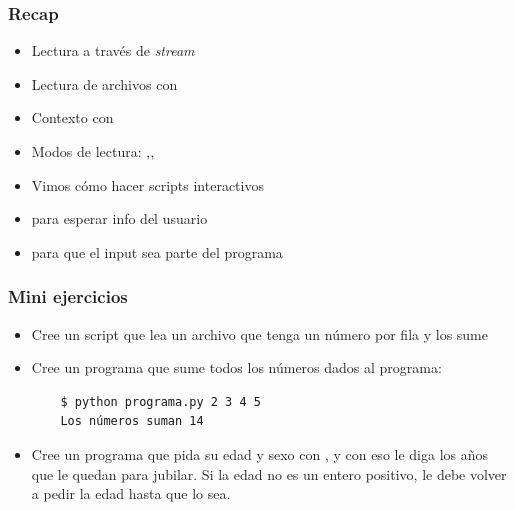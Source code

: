 \documentclass[14pt,aspectratio=169,xcolor=dvipsnames]{beamer}
\begin{document}
\begin{frame}\frametitle{Recap}
    \begin{itemize}
        \item Lectura a través de \emph{stream}
        \item Lectura de archivos con 
        \item Contexto con 
        \item Modos de lectura: ,,
        \item Vimos cómo hacer scripts interactivos
        \item {} para esperar info del usuario
        \item {} para que el input sea parte del programa
    \end{itemize}
\end{frame}
\begin{frame}
    \maketitle
\end{frame}
\begin{frame}[fragile]\frametitle{Mini ejercicios}
    \begin{footnotesize}
    \begin{itemize}
        \item Cree un script que lea un archivo que tenga un número por fila y los sume
        \item Cree un programa que sume todos los números dados al programa: 
        \begin{verbatim}
    $ python programa.py 2 3 4 5  
    Los números suman 14
        \end{verbatim}
    \item Cree un programa que pida su edad y sexo con , y con eso le diga los años que le quedan para jubilar. Si la edad no es un entero positivo, le debe volver a pedir la edad hasta que lo sea.

    \end{itemize}
    \end{footnotesize}
\end{frame}
\end{document}
